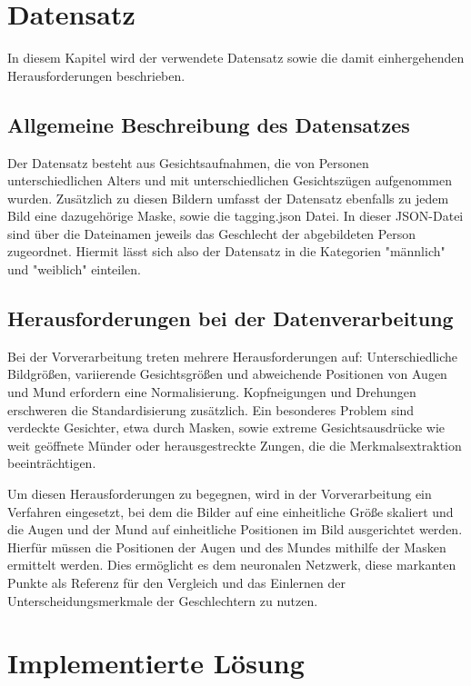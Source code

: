 \documentclass[journal,twoside,web]{ieeecolor}
\begin{document}
\section{Datensatz}
In diesem Kapitel wird der verwendete Datensatz sowie die damit einhergehenden Herausforderungen beschrieben.

\subsection{Allgemeine Beschreibung des Datensatzes}
Der Datensatz besteht aus Gesichtsaufnahmen, die von Personen unterschiedlichen Alters und mit unterschiedlichen Gesichtszügen aufgenommen wurden.
Zusätzlich zu diesen Bildern umfasst der Datensatz ebenfalls zu jedem Bild eine dazugehörige Maske, sowie die tagging.json Datei.
In dieser JSON-Datei sind über die Dateinamen jeweils das Geschlecht der abgebildeten Person zugeordnet.
Hiermit lässt sich also der Datensatz in die Kategorien "männlich" und "weiblich" einteilen.

\subsection{Herausforderungen bei der Datenverarbeitung}  
Bei der Vorverarbeitung treten mehrere Herausforderungen auf: Unterschiedliche Bildgrößen, variierende Gesichtsgrößen und abweichende Positionen von Augen und Mund erfordern eine Normalisierung.
Kopfneigungen und Drehungen erschweren die Standardisierung zusätzlich. Ein besonderes Problem sind verdeckte Gesichter, etwa durch Masken, sowie extreme Gesichtsausdrücke wie weit geöffnete Münder oder herausgestreckte Zungen, die die Merkmalsextraktion beeinträchtigen.

Um diesen Herausforderungen zu begegnen, wird in der Vorverarbeitung ein Verfahren eingesetzt, bei dem die Bilder auf eine einheitliche Größe skaliert und die Augen und der Mund auf einheitliche Positionen im Bild ausgerichtet werden.
Hierfür müssen die Positionen der Augen und des Mundes mithilfe der Masken ermittelt werden.
Dies ermöglicht es dem neuronalen Netzwerk, diese markanten Punkte als Referenz für den Vergleich und das Einlernen der Unterscheidungsmerkmale der Geschlechtern zu nutzen.












\section{Implementierte Lösung}
\end{document}
